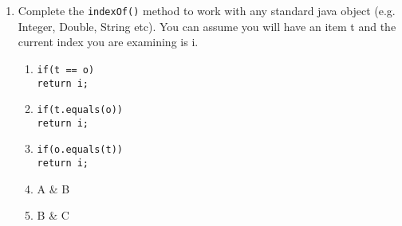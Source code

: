 \documentclass[S17-Final.tex]{subfiles}
\begin{document}
\begin{enumerate}
\item Complete the \texttt{indexOf()} method to work with any standard java object (e.g. Integer, Double, String etc). You can assume you will have an item t and the current index you are examining is i.
	
\begin{enumerate}
\item  \texttt{if(t == o)\\
    return i;}
\item  \texttt{if(t.equals(o))\\
    return i;}
\item  \texttt{if(o.equals(t))\\
    return i;}
\item  A \& B
\item  B \& C
\end{enumerate}

    
    
    
	





\end{enumerate}
\end{document}
